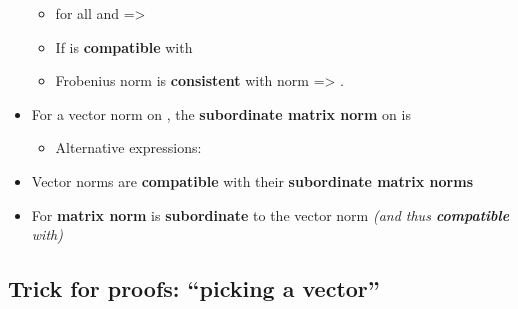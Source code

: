 \begin{itemize}
        \begin{itemize}

          \item
                for all  and
                 =>
          \item
                If  is \textbf{compatible} with
          \item
                Frobenius norm is \textbf{consistent} with  norm
                => .
        \end{itemize}
  \item
        For a vector norm \iMbox{\|\cdot\|} on , the
        \textbf{subordinate matrix norm} \iMbox{\|\cdot\|} on
         is

        \begin{itemize}

          \item
                Alternative expressions:
        \end{itemize}
  \item
        Vector norms are \textbf{compatible} with their \textbf{subordinate
          matrix norms}
  \item
        For  \textbf{matrix norm}  is
        \textbf{subordinate} to the vector norm  \emph{(and
          thus \textbf{compatible} with)}
\end{itemize}

\subsection*{Trick for proofs: ``picking a
  vector''}

